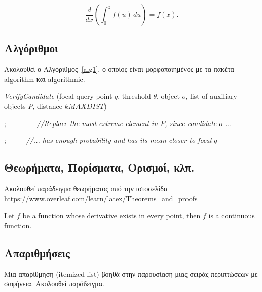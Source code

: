      \[
        \frac{d}{dx}\left( \int_{0}^{z} f(u)\,du\right)=f(x).
     \]

\subsection{Αλγόριθμοι}
Ακολουθεί ο Αλγόριθμος~\ref{alg1}, ο οποίος είναι μορφοποιημένος με τα πακέτα algorithm και algorithmic.

\begin{algorithm}[htb]
\caption{\ \ \ Probabilistic $k\theta NN$ Monitoring}
\begin{algorithmic}[1]
\begin{small}

 {\em VerifyCandidate} (focal query point $q$, threshold $\theta$, object $o$, list of auxiliary objects $P$, distance $kMAXDIST$) 


;   \ \ \ \ \ \ \ \ {\em //Replace the most extreme element in $P$, since candidate $o$ ... }

;  \ \ \ \ \ {\em //... has enough probability and has its mean closer to focal $q$ }

\ENDIF



\end{small}
\end{algorithmic}
\label{alg1}
\end{algorithm}

\subsection{Θεωρήματα, Πορίσματα, Ορισμοί, κλπ.}

Ακολουθεί παράδειγμα θεωρήματος από την ιστοσελίδα  {\small\url{https://www.overleaf.com/learn/latex/Theorems_and_proofs}}

\begin{theorem}
Let $f$ be a function whose derivative exists in every point, then $f$ 
is a continuous function.
\end{theorem}

\subsection{Απαριθμήσεις}

Μια απαρίθμηση (itemized list) βοηθά στην παρουσίαση μιας σειράς περιπτώσεων με σαφήνεια.
Ακολουθεί παράδειγμα.

